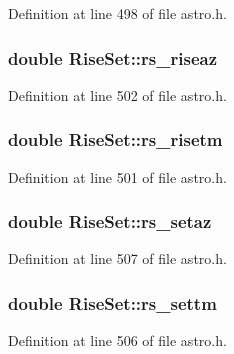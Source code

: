 Definition at line 498 of file astro.\-h.

\hypertarget{struct_rise_set_a5f7fc8d08178fb7aa9934d21770105fb}{
\subsubsection[{rs\-\_\-riseaz}]{\setlength{\rightskip}{0pt plus 5cm}double Rise\-Set\-::rs\-\_\-riseaz}}\label{struct_rise_set_a5f7fc8d08178fb7aa9934d21770105fb}


Definition at line 502 of file astro.\-h.

\hypertarget{struct_rise_set_a266796aca0a2f90dc748d9cb2ae8a42a}{
\subsubsection[{rs\-\_\-risetm}]{\setlength{\rightskip}{0pt plus 5cm}double Rise\-Set\-::rs\-\_\-risetm}}\label{struct_rise_set_a266796aca0a2f90dc748d9cb2ae8a42a}


Definition at line 501 of file astro.\-h.

\hypertarget{struct_rise_set_a56c063092c6dfe083013448c97300615}{
\subsubsection[{rs\-\_\-setaz}]{\setlength{\rightskip}{0pt plus 5cm}double Rise\-Set\-::rs\-\_\-setaz}}\label{struct_rise_set_a56c063092c6dfe083013448c97300615}


Definition at line 507 of file astro.\-h.

\hypertarget{struct_rise_set_ae0401958f5ba594cf9f60e55dd5f7a88}{
\subsubsection[{rs\-\_\-settm}]{\setlength{\rightskip}{0pt plus 5cm}double Rise\-Set\-::rs\-\_\-settm}}\label{struct_rise_set_ae0401958f5ba594cf9f60e55dd5f7a88}


Definition at line 506 of file astro.\-h.

